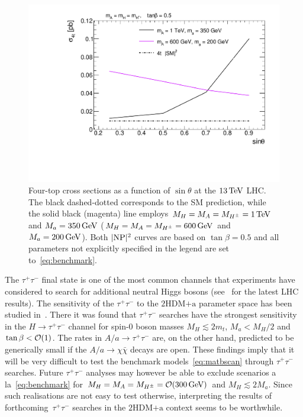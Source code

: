 \documentclass[a4paper, 11pt,notoc]{article}
\newcommand{\mA}{\ensuremath{M_{A}}\xspace}
\newcommand{\ma}{\ensuremath{M_{a}}\xspace}
\newcommand{\mH}{\ensuremath{M_{H}}\xspace}
\newcommand{\mHc}{\ensuremath{M_{H^{\pm}}}\xspace}
\newcommand{\hdma}{\ensuremath{\textrm{2HDM+a}}\xspace}
\begin{document}
\begin{figure}[t!]
\centering
\includegraphics[width=.625\textwidth]{plot_st.pdf}
\vspace{1mm}
\caption{\label{DMHF-4top-scan3} Four-top cross sections as a function of $\sin \theta$ at the $13 \, {\rm TeV}$ LHC. The black dashed-dotted corresponds to the SM prediction, while the solid black (magenta) line employs  $\mH =\mA=\mHc = 1 \, {\rm TeV}$ and $\ma = 350  \, {\rm GeV}$ ($\mH =\mA=\mHc = 600 \, {\rm GeV}$ and $\ma = 200 \, {\rm GeV}$). Both $|{\rm NP}|^2$ curves are based on $\tan \beta = 0.5$ and all parameters not explicitly specified in the legend are set to~\eqref{eq:benchmark}. }
\end{figure}

The $\tau^+ \tau^-$ final state is one of the most common channels that experiments have considered to search for additional neutral Higgs bosons (see~\cite{Aaboud:2017sjh,Sirunyan:2018zut} for the latest LHC results).   {\color{blue} The sensitivity of the $\tau^+ \tau^-$ to the \hdma parameter space has been studied in~\cite{Bauer:2017ota}.} There it was found that  $\tau^+ \tau^-$ searches have the strongest sensitivity in the $H \to \tau^+ \tau^-$ channel for  {\color{red} spin-0 boson}  masses $M_H \lesssim 2m_t$, $M_a < M_H/2$ and $\tan \beta  < {\cal O} (1)$.   The rates in  $A/a \to \tau^+ \tau^-$  are, on the other hand, predicted to be generically small if the $A/a \to \chi \bar \chi$ decays are open.  These findings imply that it will be very difficult to test the benchmark models~\eqref{eq:matbscan} through  $\tau^+ \tau^-$ searches. Future  $\tau^+ \tau^-$ analyses may however be able to exclude scenarios a la~\eqref{eq:benchmark} for $\mH = \mA = \mHc = {\cal O} (300 \, {\rm GeV})$ and $M_H \lesssim 2M_a$. Since such realisations are not easy to test otherwise, interpreting the results of forthcoming~$\tau^+ \tau^-$ searches in the \hdma context seems to be worthwhile.
\end{document}
